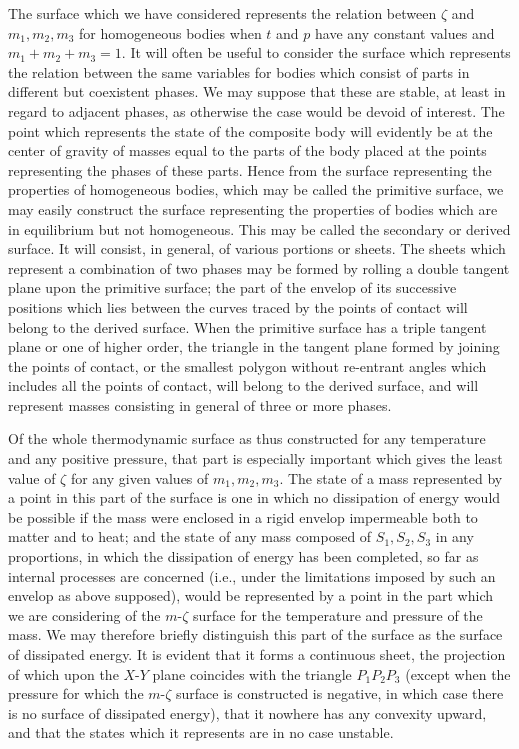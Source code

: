 \documentclass[11pt]{article}
\begin{document}
The surface which we have considered represents the relation between $\zeta$ and $m_1,m_2,m_3$ for homogeneous bodies when $t$ and $p$ have any constant values and $m_1+m_2+m_3=1$. It will often be useful to consider the surface which represents the relation between the same variables for bodies which consist of parts in different but coexistent phases. We may suppose that these are stable, at least in regard to adjacent phases, as otherwise the case would be devoid of interest. The point which represents the state of the composite body will evidently be at the center of gravity of masses equal to the parts of the body placed at the points representing the phases of these parts. Hence from the surface representing the properties of homogeneous bodies, which may be called the primitive surface, we may easily construct the surface representing the properties of bodies which are in equilibrium but not homogeneous. This may be called the secondary or derived surface. It will consist, in general, of various portions or sheets. The sheets which represent a combination of two phases may be formed by rolling a double tangent plane upon the primitive surface; the part of the envelop of its successive positions which lies between the curves traced by the points of contact will belong to the derived surface. When the primitive surface has a triple tangent plane or one of higher order, the triangle in the tangent plane formed by joining the points of contact, or the smallest polygon without re-entrant angles which includes all the points of contact, will belong to the derived surface, and will represent masses consisting in general of three or more phases.

Of the whole thermodynamic surface as thus constructed for any temperature and any positive pressure, that part is especially important which gives the least value of $\zeta$ for any given values of $m_1,m_2,m_3$. The state of a mass represented by a point in this part of the surface is one in which no dissipation of energy would be possible if the mass were enclosed in a rigid envelop impermeable both to matter and to heat; and the state of any mass composed of $S_1,S_2,S_3$ in any proportions, in which the dissipation of energy has been completed, so far as internal processes are concerned (i.e., under the limitations imposed by such an envelop as above supposed), would be represented by a point in the part which we are considering of the $m$-$\zeta$ surface for the temperature and pressure of the mass. We may therefore briefly distinguish this part of the surface as the surface of dissipated energy. It is evident that it forms a continuous sheet, the projection of which upon the $X$-$Y$ plane coincides with the triangle $P_1P_2P_3$ (except when the pressure for which the $m$-$\zeta$ surface is constructed is negative, in which case there is no surface of dissipated energy), that it nowhere has any convexity upward, and that the states which it represents are in no case unstable.
\end{document}
